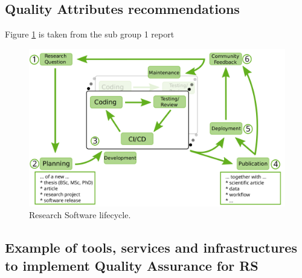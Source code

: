 \subsection{Quality Attributes recommendations}

Figure \ref{fig:rslifecycle} is taken from the sub group 1 report \cite{sg1tf2023}

\begin{figure}[h]
    \centering
    \includegraphics[width=0.99\linewidth]{imgs/rs_lifecycle.png}
    \caption{Research Software lifecycle.}
    \label{fig:rslifecycle}
\end{figure}

\subsection{Example of tools, services and infrastructures to implement Quality Assurance for RS}


